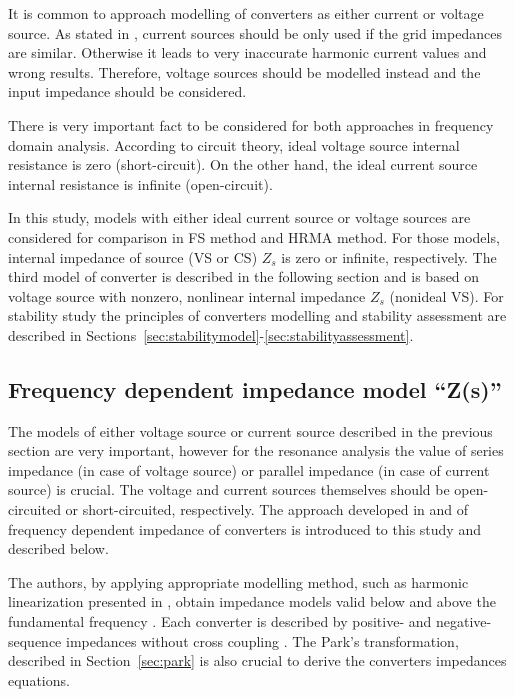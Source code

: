 \documentclass[12pt]{report} %
\begin{document}
It is common to approach modelling of converters as either current or voltage source. As stated in \cite{borwin1}, current sources should be only used if the grid impedances are similar. Otherwise it leads to very inaccurate harmonic current values and wrong results. Therefore, voltage sources should be modelled instead and the input impedance should be considered.

There is very important fact to be considered for both approaches in frequency domain analysis. According to circuit theory, ideal voltage source internal resistance is zero (short-circuit). On the other hand, the ideal current source internal resistance is infinite (open-circuit).

In this study, models with either ideal current source or voltage sources are considered for comparison in FS method and HRMA method. For those models, internal impedance of source (VS or CS) $Z_s$ is zero or infinite, respectively. The third model of converter is described in the following section and is based on voltage source with nonzero, nonlinear internal impedance $Z_s$ (nonideal VS). For stability study the principles of converters modelling and stability assessment are described in Sections~\ref{sec:stabilitymodel}-\ref{sec:stabilityassessment}.

\subsection{Frequency dependent impedance model “Z(s)”}  \label{sec:powerconverters-zs}

The models of either voltage source or current source described in the previous section are very important, however for the resonance analysis the value of series impedance (in case of voltage source) or parallel impedance (in case of current source) is crucial. The voltage and current sources themselves should be open-circuited or short-circuited, respectively. The approach developed in \cite{liusun2014} and \cite{liusun2013} of frequency dependent impedance of converters is introduced to this study and described below.

The authors, by applying appropriate modelling method, such as harmonic linearization presented in \cite{sun2009linearization, bing2009}, obtain impedance models valid below and above the fundamental frequency \cite{liusun2014}. Each converter is described by positive- and negative-sequence impedances without cross coupling \cite{cespedes2014}. The Park's transformation, described in Section~\ref{sec:park} is also crucial to derive the converters impedances equations.
\end{document}
